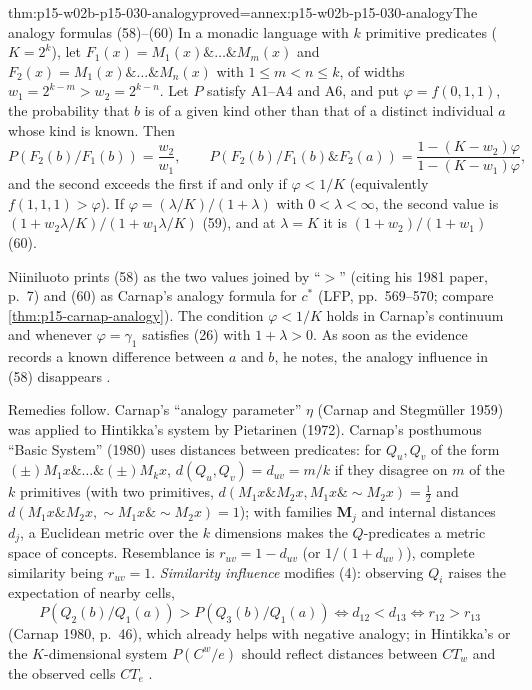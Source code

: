 \begin{hbtheorem}{thm:p15-w02b-p15-030-analogy}{proved=annex:p15-w02b-p15-030-analogy}{The analogy formulas (58)--(60)}
In a monadic language with \(k\) primitive predicates (\(K=2^k\)), let
\(F_1(x)=M_1(x)\&\ldots\&M_m(x)\) and
\(F_2(x)=M_1(x)\&\ldots\&M_n(x)\) with \(1\leq m<n\leq k\), of widths
\(w_1=2^{k-m}>w_2=2^{k-n}\). Let \(P\) satisfy A1--A4 and A6, and put
\(\varphi=f(0,1,1)\), the probability that \(b\) is of a given kind other
than that of a distinct individual \(a\) whose kind is known. Then
\[
 P(F_2(b)/F_1(b))=\frac{w_2}{w_1},\qquad
 P(F_2(b)/F_1(b)\&F_2(a))=\frac{1-(K-w_2)\varphi}{1-(K-w_1)\varphi},
\]
and the second exceeds the first if and only if \(\varphi<1/K\)
(equivalently \(f(1,1,1)>\varphi\)). If
\(\varphi=(\lambda/K)/(1+\lambda)\) with \(0<\lambda<\infty\), the second
value is \((1+w_2\lambda/K)/(1+w_1\lambda/K)\) (59), and at \(\lambda=K\) it is
\((1+w_2)/(1+w_1)\) (60).
\end{hbtheorem}

Niiniluoto prints (58) as the two values joined by ``\(>\)'' (citing his
1981 paper, p.~7) and (60) as Carnap's analogy formula for \(c^*\) (LFP,
pp.~569--570; compare \cref{thm:p15-carnap-analogy}). The condition
\(\varphi<1/K\) holds in Carnap's continuum and whenever \(\varphi=\gamma_1\)
satisfies (26) with \(1+\lambda>0\). As soon as the evidence records a known
difference between \(a\) and \(b\), he notes, the analogy influence in (58)
disappears \cite[pp.~340--341]{Niiniluoto2011HintikkaProgramReading}.

Remedies follow. Carnap's ``analogy parameter'' \(\eta\) (Carnap and
Stegmüller 1959) was applied to Hintikka's system by Pietarinen (1972).
Carnap's posthumous ``Basic System'' (1980) uses distances between
predicates: for \(Q_u,Q_v\) of the form \((\pm)M_1x\&\ldots\&(\pm)M_kx\),
\(d(Q_u,Q_v)=d_{uv}=m/k\) if they disagree on \(m\) of the \(k\) primitives
(with two primitives, \(d(M_1x\&M_2x,M_1x\&\sim M_2x)=\tfrac12\) and
\(d(M_1x\&M_2x,\sim M_1x\&\sim M_2x)=1\)); with families \(\mathbf M_j\) and
internal distances \(d_j\), a Euclidean metric over the \(k\) dimensions
makes the \(Q\)-predicates a metric space of concepts. Resemblance is
\(r_{uv}=1-d_{uv}\) (or \(1/(1+d_{uv})\)), complete similarity being
\(r_{uv}=1\). \emph{Similarity influence} modifies (4): observing \(Q_i\)
raises the expectation of nearby cells,
\[
 P(Q_2(b)/Q_1(a))>P(Q_3(b)/Q_1(a))\iff d_{12}<d_{13}\iff r_{12}>r_{13}
\]
(Carnap 1980, p.~46), which already helps with negative analogy; in
Hintikka's or the \(K\)-dimensional system \(P(C^w/e)\) should reflect
distances between \(CT_w\) and the observed cells \(CT_e\)
\cite[pp.~341--342]{Niiniluoto2011HintikkaProgramReading}.

